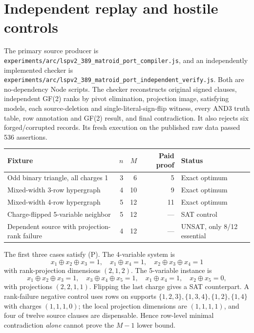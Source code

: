 \documentclass[11pt]{article}
\begin{document}
\section*{Independent replay and hostile controls}
The primary source producer is \texttt{experiments/arc/lspv2\_389\_matroid\_port\_compiler.js}, and an independently implemented checker is \texttt{experiments/arc/lspv2\_389\_matroid\_port\_independent\_verify.js}. Both are no-dependency Node scripts. The checker reconstructs original signed clauses, independent GF(2) ranks by pivot elimination, projection image, satisfying models, each source-deletion and single-literal-sign-flip witness, every AND3 truth table, row annotation and GF(2) result, and final contradiction. It also rejects six forged/corrupted records. Its fresh execution on the published raw data passed 536 assertions.

\begin{center}\begin{tabular}{p{}rrrp{}}
\toprule
Fixture & $n$ & $M$ & Paid proof & Status\\
\midrule
Odd binary triangle, all charges 1 & 3&6&5&Exact optimum\\
Mixed-width 3-row hypergraph &4&10&9&Exact optimum\\
Mixed-width 4-row hypergraph &5&12&11&Exact optimum\\
Charge-flipped 5-variable neighbor &5&12&---&SAT control\\
Dependent source with projection-rank failure &4&12&---&UNSAT, only 8/12 essential\\
\bottomrule
\end{tabular}\end{center}

The first three cases satisfy (P). The 4-variable system is
\[
x_1\oplus x_2\oplus x_3=1,\quad x_1\oplus x_4=1,\quad
x_2\oplus x_3\oplus x_4=1
\]
with rank-projection dimensions $(2,1,2)$. The 5-variable instance is
\[
x_1\oplus x_2\oplus x_3=1,\quad
x_3\oplus x_4\oplus x_5=1,\quad
x_1\oplus x_4=1,\quad x_2\oplus x_5=0,
\]
with projections $(2,2,1,1)$. Flipping the last charge gives a SAT counterpart. A rank-failure negative control uses rows on supports $\{1,2,3\},\{1,3,4\},\{1,2\},\{1,4\}$ with charges $(1,1,1,0)$; the local projection dimensions are $(1,1,1,1)$, and four of twelve source clauses are dispensable. Hence row-level minimal contradiction \emph{alone} cannot prove the $M-1$ lower bound.
\end{document}
